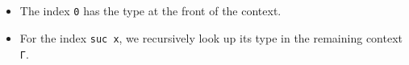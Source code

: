 \begin{fence}
\begin{code}%
\>[0]\AgdaSpace{}%
\AgdaSpace{}%
\AgdaSymbol{:}\AgdaSpace{}%
\AgdaSpace{}%
\AgdaSpace{}%
\AgdaSpace{}%
\AgdaSpace{}%
\AgdaSpace{}%
\AgdaSpace{}%
\AgdaSpace{}%
\<%
\\
%
\\[\AgdaEmptyExtraSkip]%
\>[0][@{}l@{\AgdaIndent{0}}]%
\>[2]%
\>[1095I]\AgdaSymbol{:}%
\>[1096I]\AgdaSpace{}%
\AgdaSymbol{\{}\AgdaSpace{}%
\AgdaSymbol{\}}\<%
\\
\>[.][@{}l@{}]\<[1096I]%
\>[6]\AgdaComment{------------------}\<%
\\
\>[.][@{}l@{}]\<[1095I]%
\>[4]\AgdaSpace{}%
\AgdaSpace{}%
\AgdaOperator{\AgdaInductiveConstructor{,}}\AgdaSpace{}%
\AgdaSpace{}%
\AgdaSpace{}%
\AgdaSpace{}%
\AgdaSpace{}%
\<%
\\
%
\\[\AgdaEmptyExtraSkip]%
%
\>[2]%
\>[1106I]\AgdaSymbol{:}\AgdaSpace{}%
\AgdaSpace{}%
\AgdaSymbol{\{}\AgdaSpace{}%
\AgdaSpace{}%
\AgdaSpace{}%
\AgdaSymbol{\}}\<%
\\
\>[.][@{}l@{}]\<[1106I]%
\>[4]%
\>[1112I]\AgdaSpace{}%
\AgdaSpace{}%
\AgdaSpace{}%
\AgdaSpace{}%
\<%
\\
\>[.][@{}l@{}]\<[1112I]%
\>[6]\AgdaComment{------------------}\<%
\\
%
\>[4]\AgdaSpace{}%
\AgdaSpace{}%
\AgdaOperator{\AgdaInductiveConstructor{,}}\AgdaSpace{}%
\AgdaSpace{}%
\AgdaSpace{}%
\AgdaSymbol{(}\AgdaSpace{}%
\AgdaSymbol{)}\AgdaSpace{}%
\AgdaSpace{}%
\<%
\end{code}
\end{fence}

\begin{itemize}
\item
  The index \texttt{0} has the type at the front of the context.
\item
  For the index \texttt{suc\ x}, we recursively look up its type in the
  remaining context \texttt{Γ}.
\end{itemize}

